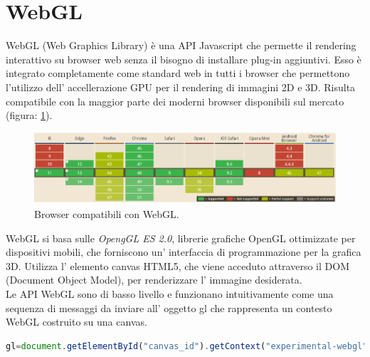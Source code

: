 \section{WebGL}
\label{sec:chapter_tecnologie_abilitanti_webgl}
WebGL (Web Graphics Library) è una API Javascript che permette il rendering interattivo su browser web senza il bisogno di installare plug-in aggiuntivi.
Esso è integrato completamente come standard web in tutti i browser che permettono l’utilizzo dell’ accellerazione GPU per il rendering di immagini 2D e 3D.
Risulta compatibile con la maggior parte dei moderni browser disponibili sul mercato (figura: \ref{fig:stato_arte_webgl_compat}).
\\
\begin{figure}[htb]
 \centering
 \includegraphics[width=0.8\linewidth]{images/chapter_tecnologie_abilitanti/tecnologie_abilitanti_webgl_compat.png}\hfill
 \caption[Lista browser compatibili]{Browser compatibili con WebGL.}
 \label{fig:stato_arte_webgl_compat}
\end{figure}
WebGL si basa sulle \emph{OpengGL ES 2.0}, librerie grafiche OpenGL ottimizzate per dispositivi mobili, che forniscono un’ interfaccia di programmazione per la grafica 3D. Utilizza l’ elemento canvas HTML5, che viene acceduto attraverso il DOM (Document Object Model), per renderizzare l’ immagine desiderata.
\\
Le API WebGL sono di basso livello e funzionano intuitivamente come una sequenza di messaggi da inviare all’ oggetto gl che rappresenta un contesto WebGL costruito su una canvas.
\begin{lstlisting}[language=JavaScript]
gl=document.getElementById("canvas_id").getContext("experimental-webgl");
\end{lstlisting}

